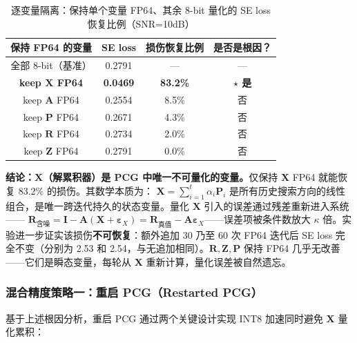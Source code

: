 \documentclass{CjC}
\begin{document}
    \begin{table}[H]
        \centering
        \caption{逐变量隔离：保持单个变量 FP64、其余 8-bit 量化的 SE loss 恢复比例（SNR=10dB）}
        \label{tab:var-isolation}
        \begin{tabular}{c c c c}
            \toprule 保持 FP64 的变量 & SE loss & 损伤恢复比例 & 是否是根因？ \\
            \midrule 全部 8-bit（基准）& 0.2791 & —     & — \\
            \textbf{keep $\bm{X}$ FP64} & \textbf{0.0469} & \textbf{83.2\%} & \textbf{$\star$ 是} \\
            keep $\bm{A}$ FP64 & 0.2554 & 8.5\%  & 否 \\
            keep $\bm{P}$ FP64 & 0.2671 & 4.3\%  & 否 \\
            keep $\bm{R}$ FP64 & 0.2734 & 2.0\%  & 否 \\
            keep $\bm{Z}$ FP64 & 0.2791 & 0.0\%  & 否 \\
            \bottomrule
        \end{tabular}
    \end{table}
    
    \textbf{结论：$\bm{X}$（解累积器）是 PCG 中唯一不可量化的变量。}仅保持 $\bm{X}$ FP64 就能恢复 83.2\% 的损伤。其数学本质为：
    $\bm{X}=\sum_{i=1}^{t}\alpha_{i}\bm{P}_{i}$ 是所有历史搜索方向的线性组合，是唯一跨迭代持久的状态变量。量化 $\bm{X}$ 引入的误差通过残差重新进入系统——
    $\bm{R}_{\text{含噪}}=\bm{I}-\bm{A}(\bm{X}+\bm{\varepsilon}_{X})=\bm{R}_{\text{真值}}-\bm{A}\bm{\varepsilon}_{X}$——误差项被条件数放大
    $\kappa$ 倍。实验进一步证实该损伤\textbf{不可恢复}：额外追加 30 乃至 60 次 FP64 迭代后 SE loss 完全不变（分别为 2.53 和 2.54，与无追加相同）。$\bm{R},\bm{Z},\bm{P}$ 保持 FP64 几乎无改善——它们是瞬态变量，每轮从 $\bm{X}$ 重新计算，量化误差被自然遗忘。
    
    \subsubsection{混合精度策略一：重启 PCG（Restarted PCG）}
    
    基于上述根因分析，重启 PCG 通过两个关键设计实现 INT8 加速同时避免 $\bm{X}$ 量化累积：
    
\end{document}
